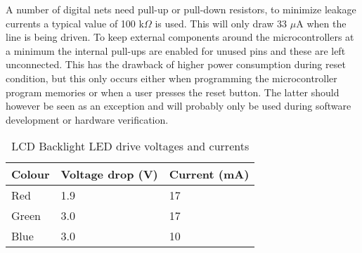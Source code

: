A number of digital nets need pull-up or pull-down resistors, to
minimize leakage currents a typical value of 100 k$\Omega$ is
used. This will only draw 33 $\mu$A when the line is being driven. To
keep external components around the microcontrollers at a minimum the
internal pull-ups are enabled for unused pins and these are left
unconnected. This has the drawback of higher power consumption during
reset condition, but this only occurs either when programming the
microcontroller program memories or when a user presses the reset
button. The latter should however be seen as an exception and will
probably only be used during software development or hardware
verification.


\begin{table}
\begin{tabular}{|l|l|l|}
\hline
Colour & Voltage drop (V) & Current (mA)\\
\hline
Red & 1.9 & 17\\
Green & 3.0 & 17\\
Blue & 3.0 & 10\\
\hline
\end{tabular}
\caption{LCD Backlight LED drive voltages and currents}
\label{tab:backlightleds}
\end{table}
